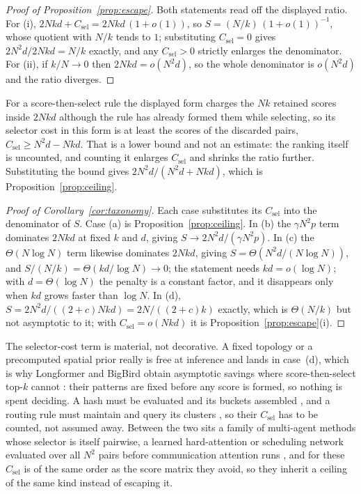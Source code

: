 \begin{proof}[Proof of Proposition~\ref{prop:escape}]
Both statements read off the displayed ratio. For (i),
$2Nkd + C_{\mathrm{sel}} = 2Nkd\,(1+o(1))$, so
$S = (N/k)\,(1+o(1))^{-1}$, whose quotient with $N/k$ tends to $1$;
substituting $C_{\mathrm{sel}} = 0$ gives $2N^2 d/2Nkd = N/k$ exactly, and any
$C_{\mathrm{sel}} > 0$ strictly enlarges the denominator. For (ii), if
$k/N \to 0$ then $2Nkd = o(N^2 d)$, so the whole denominator is $o(N^2 d)$ and
the ratio diverges.
\end{proof}

For a score-then-select rule the displayed form charges the $Nk$ retained
scores inside $2Nkd$ although the rule has already formed them while
selecting, so its selector cost in this form is at least the scores of the
discarded pairs, $C_{\mathrm{sel}} \ge N^2 d - Nkd$. That is a lower bound and
not an estimate: the ranking itself is uncounted, and counting it enlarges
$C_{\mathrm{sel}}$ and shrinks the ratio further. Substituting the bound gives
$2N^2d/(N^2d + Nkd)$, which is Proposition~\ref{prop:ceiling}.

\begin{proof}[Proof of Corollary~\ref{cor:taxonomy}]
Each case substitutes its $C_{\mathrm{sel}}$ into the denominator of $S$. Case
(a) is Proposition~\ref{prop:ceiling}. In (b) the $\gamma N^2 p$ term dominates
$2Nkd$ at fixed $k$ and $d$, giving $S \to 2N^2d/(\gamma N^2 p)$. In (c) the
$\Theta(N\log N)$ term likewise dominates $2Nkd$, giving
$S = \Theta(N^2 d / (N \log N))$, and $S/(N/k) = \Theta(kd/\log N) \to 0$; the
statement needs $kd = o(\log N)$; with $d = \Theta(\log N)$ the penalty is a
constant factor, and it disappears only when $kd$ grows faster than $\log N$. In (d), $S = 2N^2d/((2+c)Nkd) = 2N/((2+c)k)$ exactly, which is
$\Theta(N/k)$ but not asymptotic to it; with $C_{\mathrm{sel}} = o(Nkd)$ it is
Proposition~\ref{prop:escape}(i).
\end{proof}

The selector-cost term is material, not decorative. A fixed topology or a
precomputed spatial prior really is free at inference and lands in case~(d),
which is why Longformer and BigBird obtain asymptotic savings where
score-then-select top-$k$ cannot
\citep{beltagy2020longformer,zaheer2020bigbird}: their patterns are fixed before
any score is formed, so nothing is spent deciding. A hash must be evaluated and
its buckets assembled \citep{kitaev2020reformer}, and a routing rule must
maintain and query its clusters \citep{roy2021routing}, so their
$C_{\mathrm{sel}}$ has to be counted, not assumed away. Between the two
sits a family of multi-agent methods whose selector is itself pairwise, a
learned hard-attention or scheduling network evaluated over all $N^2$ pairs
before communication attention runs \citep{liu2020g2anet,niu2021magic}, and
for these $C_{\mathrm{sel}}$ is of the same order as the score matrix they
avoid, so they inherit a ceiling of the same kind instead of escaping it.

